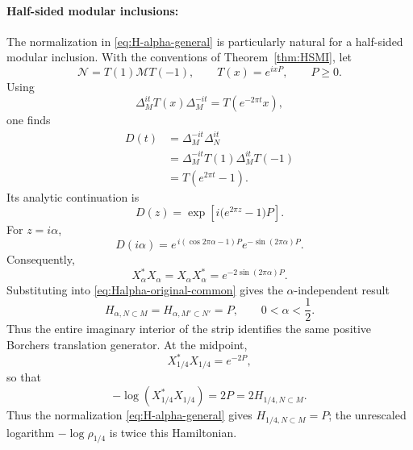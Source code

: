 \documentclass[a4paper,11pt]{article}
\theoremstyle{definition}
\begin{document}
\paragraph{Half-sided modular inclusions:} The normalization in \eqref{eq:H-alpha-general} is particularly natural for
a half-sided modular inclusion. With the conventions of
Theorem~\ref{thm:HSMI}, let
\begin{equation}
    \mathcal N
    =
    T(1)\mathcal MT(-1),
    \qquad
    T(x)=e^{ixP},
    \qquad
    P\geq0 .
\end{equation}
Using
\begin{equation}
    \Delta_M^{it}
    T(x)
    \Delta_M^{-it}
    =
    T(e^{-2\pi t}x),
\end{equation}
one finds
\begin{align}
    D(t)
    &=
    \Delta_M^{-it}\Delta_N^{it}
    \nonumber\\
    &=
    \Delta_M^{-it}
    T(1)\Delta_M^{it}T(-1)
    \nonumber\\
    &=
    T(e^{2\pi t}-1).
    \label{eq:D-HSMI-explicit}
\end{align}
Its analytic continuation is
\begin{equation}
    D(z)
    =
    \exp\left[
        i\bigl(e^{2\pi z}-1\bigr)P
    \right].
    \label{eq:D-HSMI-complex}
\end{equation}
For $z=i\alpha$,
\begin{equation}
    D(i\alpha)
    =
    e^{\,i(\cos 2\pi\alpha-1)P}
    e^{-\sin(2\pi\alpha)P}.
\end{equation}
Consequently,
\begin{equation}
    X_\alpha^*X_\alpha
    =
    X_\alpha X_\alpha^*
    =
    e^{-2\sin(2\pi\alpha)P}.
    \label{eq:rho-HSMI-alpha}
\end{equation}
Substituting into \eqref{eq:Halpha-original-common} gives the
$\alpha$-independent result
\begin{equation}
    \boxed{
    H_{\alpha,N\subset M}
    =
    H_{\alpha,M'\subset N'}
    =
    P,
    \qquad
    0<\alpha<\frac12 .
    }
    \label{eq:Halpha-HSMI-P}
\end{equation}
Thus the entire imaginary interior of the strip identifies the same positive
Borchers translation generator. At the midpoint,
\begin{equation}
    X_{1/4}^*X_{1/4}=e^{-2P},
\end{equation}
so that
\begin{equation}
    -\log(X_{1/4}^*X_{1/4})=2P=2H_{1/4,N\subset M}.
\end{equation}
Thus the normalization \eqref{eq:H-alpha-general} gives
$H_{1/4,N\subset M}=P$; the unrescaled logarithm $-\log\rho_{1/4}$ is twice
this Hamiltonian.
\end{document}
